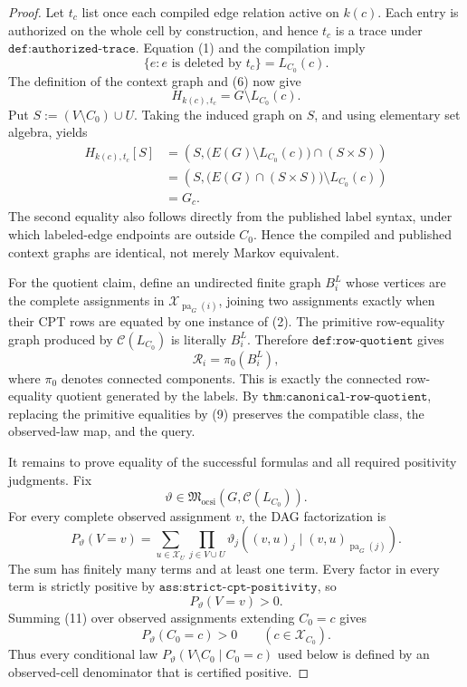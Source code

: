 \documentclass{article}
\begin{document}
\begin{proof}
Let \(t_c\) list once each compiled edge relation active on \(k(c)\).  Each entry is authorized on the whole cell by construction, and hence \(t_c\) is a trace under \(\texttt{def:authorized-trace}\).  Equation (1) and the compilation imply
\[
\{e:e\text{ is deleted by }t_c\}=L_{C_0}(c).
\tag{6}
\]
The definition of the context graph and (6) now give
\[
H_{k(c),t_c}=G\setminus L_{C_0}(c).
\tag{7}
\]
Put \(S:=(V\setminus C_0)\cup U\).  Taking the induced graph on \(S\), and using elementary set algebra, yields
\[
\begin{aligned}
H_{k(c),t_c}[S]
&=\left(S,\bigl(E(G)\setminus L_{C_0}(c)\bigr)\cap(S\times S)\right)\\
&=\left(S,\bigl(E(G)\cap(S\times S)\bigr)\setminus L_{C_0}(c)\right)\\
&=G_c.
\end{aligned}
\tag{8}
\]
The second equality also follows directly from the published label syntax, under which labeled-edge endpoints are outside \(C_0\).  Hence the compiled and published context graphs are identical, not merely Markov equivalent.

For the quotient claim, define an undirected finite graph \(B_i^L\) whose vertices are the complete assignments in \(\mathcal X_{\operatorname{pa}_G(i)}\), joining two assignments exactly when their CPT rows are equated by one instance of (2).  The primitive row-equality graph produced by \(\mathcal C(L_{C_0})\) is literally \(B_i^L\).  Therefore \(\texttt{def:row-quotient}\) gives
\[
\mathcal R_i=\pi_0(B_i^L),
\tag{9}
\]
where \(\pi_0\) denotes connected components.  This is exactly the connected row-equality quotient generated by the labels.  By \(\texttt{thm:canonical-row-quotient}\), replacing the primitive equalities by (9) preserves the compatible class, the observed-law map, and the query.

It remains to prove equality of the successful formulas and all required positivity judgments.  Fix
\[
\vartheta\in
\mathfrak M_{\mathrm{ocsi}}\!\left(G,\mathcal C(L_{C_0})\right).
\]
For every complete observed assignment \(v\), the DAG factorization is
\[
P_\vartheta(V=v)
=\sum_{u\in\mathcal X_U}
  \prod_{j\in V\cup U}
  \vartheta_j\!\left((v,u)_j\mid
  (v,u)_{\operatorname{pa}_G(j)}\right).
\tag{10}
\]
The sum has finitely many terms and at least one term.  Every factor in every term is strictly positive by \(\texttt{ass:strict-cpt-positivity}\), so
\[
P_\vartheta(V=v)>0.
\tag{11}
\]
Summing (11) over observed assignments extending \(C_0=c\) gives
\[
P_\vartheta(C_0=c)>0
\qquad(c\in\mathcal X_{C_0}).
\tag{12}
\]
Thus every conditional law \(P_\vartheta(V\setminus C_0\mid C_0=c)\) used below is defined by an observed-cell denominator that is certified positive.


\end{proof}
\end{document}
